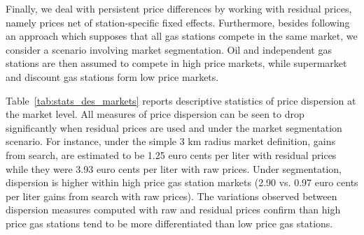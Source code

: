 \documentclass[english]{article}
\begin{document}
Finally, we deal with persistent price differences by working with residual prices, namely prices net of station-specific fixed effects. Furthermore, besides following an approach which supposes that all gas stations compete in the same market, we consider a scenario involving market segmentation. Oil and independent gas stations are then assumed to compete in high price markets, while supermarket and discount gas stations form low price markets.

Table~\ref{tab:stats_des_markets} reports descriptive statistics of price dispersion at the market level. All measures of price dispersion can be seen to drop significantly when residual prices are used and under the market segmentation scenario. For instance, under the simple 3 km radius market definition, gains from search, are estimated to be 1.25 euro cents per liter with residual prices while they were 3.93 euro cents per liter with raw prices. Under segmentation, dispersion is higher within high price gas station markets (2.90 vs. 0.97 euro cents per liter gains from search with raw prices). The variations observed between dispersion measures computed with raw and residual prices confirm than high price gas stations tend to be more differentiated than low price gas stations.
\end{document}
